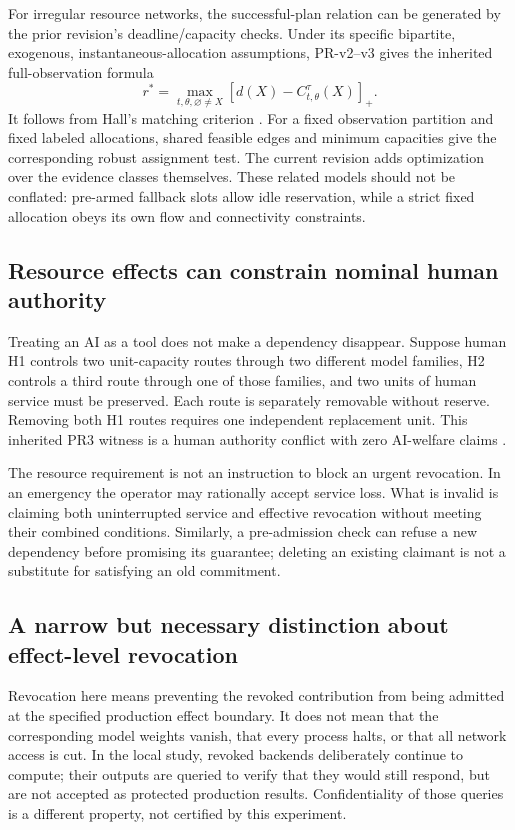 \documentclass[11pt,a4paper]{article}
\theoremstyle{definition}\newtheorem{definition}{Definition}
\newcommand{\pos}[1]{\left[#1\right]_+}
\begin{document}
For irregular resource networks, the successful-plan relation can be generated by the prior revision's deadline/capacity checks. Under its specific bipartite, exogenous, instantaneous-allocation assumptions, PR-v2--v3 gives the inherited full-observation formula
\begin{equation}
\label{eq:hall}
r^*=\max_{t,\theta,\varnothing\ne X}\pos{d(X)-C^\tau_{t,\theta}(X)}.
\end{equation}
It follows from Hall's matching criterion \cite{hall,liu3}. For a fixed observation partition and fixed labeled allocations, shared feasible edges and minimum capacities give the corresponding robust assignment test. The current revision adds optimization over the evidence classes themselves. These related models should not be conflated: pre-armed fallback slots allow idle reservation, while a strict fixed allocation obeys its own flow and connectivity constraints.

\subsection{Resource effects can constrain nominal human authority}
Treating an AI as a tool does not make a dependency disappear. Suppose human H1 controls two unit-capacity routes through two different model families, H2 controls a third route through one of those families, and two units of human service must be preserved. Each route is separately removable without reserve. Removing both H1 routes requires one independent replacement unit. This inherited PR3 witness is a human authority conflict with zero AI-welfare claims \cite{liu3}.

The resource requirement is not an instruction to block an urgent revocation. In an emergency the operator may rationally accept service loss. What is invalid is claiming both uninterrupted service and effective revocation without meeting their combined conditions. Similarly, a pre-admission check can refuse a new dependency before promising its guarantee; deleting an existing claimant is not a substitute for satisfying an old commitment.

\subsection{A narrow but necessary distinction about effect-level revocation}
Revocation here means preventing the revoked contribution from being admitted at the specified production effect boundary. It does not mean that the corresponding model weights vanish, that every process halts, or that all network access is cut. In the local study, revoked backends deliberately continue to compute; their outputs are queried to verify that they would still respond, but are not accepted as protected production results. Confidentiality of those queries is a different property, not certified by this experiment.
\end{document}
